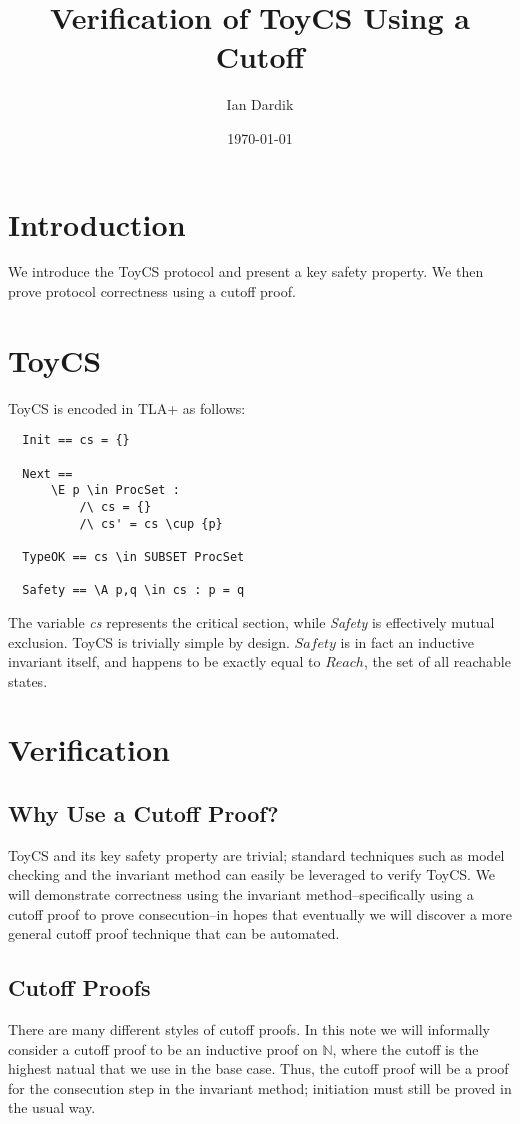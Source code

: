 \documentclass[12pt]{article}
\title{Verification of ToyCS Using a Cutoff}
\author{Ian Dardik}
\date{\today}
\begin{document}
\maketitle

\section{Introduction}
We introduce the ToyCS protocol and present a key safety property.  We then prove protocol correctness using a cutoff proof.

\section{ToyCS}
ToyCS is encoded in TLA+ as follows:
\begin{verbatim}
  Init == cs = {}

  Next ==
      \E p \in ProcSet :
          /\ cs = {}
          /\ cs' = cs \cup {p}

  TypeOK == cs \in SUBSET ProcSet

  Safety == \A p,q \in cs : p = q
\end{verbatim}

The variable \textit{cs} represents the critical section, while \textit{Safety} is effectively mutual exclusion.  ToyCS is trivially simple by design.  $Safety$ is in fact an inductive invariant itself, and happens to be exactly equal to $Reach$, the set of all reachable states.

\section{Verification}

\subsection{Why Use a Cutoff Proof?}
\label{ssec:why}
ToyCS and its key safety property are trivial; standard techniques such as model checking and the invariant method can easily be leveraged to verify ToyCS.  We will demonstrate correctness using the invariant method--specifically using a cutoff proof to prove consecution--in hopes that eventually we will discover a more general cutoff proof technique that can be automated.

\subsection{Cutoff Proofs}
There are many different styles of cutoff proofs.  In this note we will informally consider a cutoff proof to be an inductive proof on $\mathbb{N}$, where the cutoff is the highest natual that we use in the base case.  Thus, the cutoff proof will be a proof for the consecution step in the invariant method; initiation must still be proved in the usual way.
\end{document}
